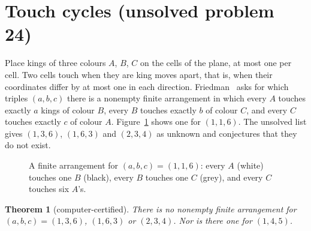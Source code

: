 \documentclass[11pt]{amsart}
\newtheorem{theorem}{Theorem}
\theoremstyle{remark}
\begin{document}
\section{Touch cycles (unsolved problem 24)}\label{sec:touch}

Place kings of three colours $A$, $B$, $C$ on the cells of the plane, at most one per cell. Two cells
touch when they are king moves apart, that is, when their coordinates differ by at most one in each
direction. Friedman~\cite{touch} asks for which triples $(a,b,c)$ there is a nonempty finite
arrangement in which every $A$ touches exactly $a$ kings of colour $B$, every $B$ touches exactly $b$
of colour $C$, and every $C$ touches exactly $c$ of colour $A$. Figure~\ref{fig:touch} shows one for
$(1,1,6)$. The unsolved list gives $(1,3,6)$, $(1,6,3)$ and $(2,3,4)$ as unknown and conjectures that
they do not exist.

\begin{figure}[ht]
\centering

\caption{A finite arrangement for $(a,b,c)=(1,1,6)$: every $A$ (white) touches one $B$ (black),
every $B$ touches one $C$ (grey), and every $C$ touches six $A$'s.}\label{fig:touch}
\end{figure}

\begin{theorem}[computer-certified]\label{thm:touch}
There is no nonempty finite arrangement for $(a,b,c)=(1,3,6)$, $(1,6,3)$ or $(2,3,4)$. Nor is there
one for $(1,4,5)$.
\end{theorem}
\end{document}
